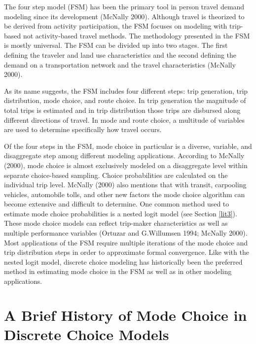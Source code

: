 \documentclass[12pt, oneside, openright]{byuthesis}
\begin{document}
The four step model (FSM) has been the primary tool in person travel demand modeling since its development (McNally 2000). Although travel is theorized to be derived from activity participation, the FSM focuses on modeling with trip-based not activity-based travel methods. The methodology presented in the FSM is mostly universal. The FSM can be divided up into two stages. The first defining the traveler and land use characteristics and the second defining the demand on a transportation network and the travel characteristics (McNally 2000).

As its name suggests, the FSM includes four different steps: trip generation, trip distribution, mode choice, and route choice. In trip generation the magnitude of total trips is estimated and in trip distribution those trips are disbursed along different directions of travel. In mode and route choice, a multitude of variables are used to determine specifically how travel occurs.

Of the four steps in the FSM, mode choice in particular is a diverse, variable, and disaggregate step among different modeling applications. According to McNally (2000), mode choice is almost exclusively modeled on a disaggregate level within separate choice-based sampling. Choice probabilities are calculated on the individual trip level. McNally (2000) also mentions that with transit, carpooling vehicles, automobile tolls, and other new factors the mode choice algorithm can become extensive and difficult to determine. One common method used to estimate mode choice probabilities is a nested logit model (see Section \ref{lit3}). These mode choice models can reflect trip-maker characteristics as well as multiple performance variables (Ortuzar and G.Willumsen 1994; McNally 2000). Most applications of the FSM require multiple iterations of the mode choice and trip distribution steps in order to approximate formal convergence. Like with the nested logit model, discrete choice modeling has historically been the preferred method in estimating mode choice in the FSM as well as in other modeling applications.

\hypertarget{lit2}{%
\section{A Brief History of Mode Choice in Discrete Choice Models}\label{lit2}}
\end{document}
